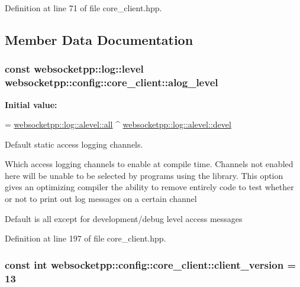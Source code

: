 Definition at line 71 of file core\+\_\+client.\+hpp.



\subsection{Member Data Documentation}
\subsubsection[{\texorpdfstring{alog\+\_\+level}{alog\_level}}]{\setlength{\rightskip}{0pt plus 5cm}const websocketpp\+::log\+::level websocketpp\+::config\+::core\+\_\+client\+::alog\+\_\+level\hspace{0.3cm}{\ttfamily [static]}}\hypertarget{structwebsocketpp_1_1config_1_1core__client_a286f74bd1d4f4a7c363866ef92284992}{}\label{structwebsocketpp_1_1config_1_1core__client_a286f74bd1d4f4a7c363866ef92284992}
{\bfseries Initial value\+:}
\begin{DoxyCode}
=
        \hyperlink{structwebsocketpp_1_1log_1_1alevel_a853aa0b8976e53f3181af3bc398d493e}{websocketpp::log::alevel::all} ^ 
      \hyperlink{structwebsocketpp_1_1log_1_1alevel_a65ec21c75999c993c25c72569018f576}{websocketpp::log::alevel::devel}
\end{DoxyCode}


Default static access logging channels. 

Which access logging channels to enable at compile time. Channels not enabled here will be unable to be selected by programs using the library. This option gives an optimizing compiler the ability to remove entirely code to test whether or not to print out log messages on a certain channel

Default is all except for development/debug level access messages 

Definition at line 197 of file core\+\_\+client.\+hpp.

\subsubsection[{\texorpdfstring{client\+\_\+version}{client\_version}}]{\setlength{\rightskip}{0pt plus 5cm}const int websocketpp\+::config\+::core\+\_\+client\+::client\+\_\+version = 13\hspace{0.3cm}{\ttfamily [static]}}\hypertarget{structwebsocketpp_1_1config_1_1core__client_afa438e9269e4bd4bc3815979e0de0083}{}\label{structwebsocketpp_1_1config_1_1core__client_afa438e9269e4bd4bc3815979e0de0083}


